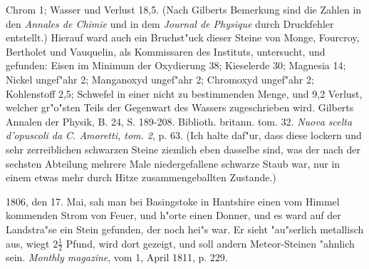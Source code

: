 \documentclass[a4paper, 11pt, oneside, polutonikogreek, german]{article}
\begin{document}
Chrom 1; Wasser und Verlust 18,5. (Nach Gilberts Bemerkung sind die Zahlen in den \emph{Annales de Chimie} und in dem \emph{Journal de Physique} durch Druckfehler entstellt.) Hierauf ward auch ein Bruchst"uck dieser Steine von Monge, Fourcroy, Bertholet und Vauquelin, als Kommissaren des Instituts, untersucht, und gefunden: Eisen im Minimum der Oxydierung 38; Kieselerde 30; Magnesia 14; Nickel ungef"ahr 2; Manganoxyd ungef"ahr 2; Chromoxyd ungef"ahr 2; Kohlenstoff 2,5; Schwefel in einer nicht zu bestimmenden Menge, und 9,2 Verlust, welcher gr"o"sten Teils der Gegenwart des Wassers zugeschrieben wird. Gilberts Annalen der Physik, B. 24, S. 189-208. Biblioth. britann. tom. 32. \emph{Nuova scelta d'opuscoli da C. Amoretti, tom. 2}, p. 63. (Ich halte daf"ur, dass diese lockern und sehr zerreiblichen schwarzen Steine ziemlich eben dasselbe sind, was der nach der sechsten Abteilung mehrere Male niedergefallene schwarze Staub war, nur in einem etwas mehr durch Hitze zusammengeballten Zustande.)

1806, den 17. Mai, sah man bei Basingstoke in Hantshire einen vom Himmel kommenden Strom von Feuer, und h"orte einen Donner, und es ward auf der Landstra"se ein Stein gefunden, der noch hei"s war. Er sieht "au"serlich metallisch aus, wiegt $\mathfrak{2\frac{1}{2}}$ Pfund, wird dort gezeigt, und soll andern Meteor-Steinen "ahnlich sein. \emph{Monthly magazine}, vom 1, April 1811, p. 229.
\end{document}
